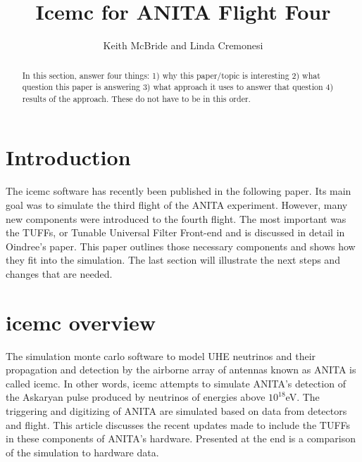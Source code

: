 \documentclass[12pt]{article}
\theoremstyle{plain}
\theoremstyle{definition}
\begin{document}
 

\title{Icemc for ANITA Flight Four}
\author{Keith McBride and Linda Cremonesi}
\maketitle
\begin{abstract}
	In this section, answer four things: 1) why this paper/topic is interesting 2) what question this paper is answering 3) what approach it uses to answer that question 4) results of the approach. These do not have to be in this order.
\end{abstract}
\tableofcontents
\pagebreak
\section{Introduction}
\hspace{0.2in}
  The icemc software has recently been published in the following paper. Its main goal was to simulate the third flight of the ANITA experiment.  However, many new components were introduced to the fourth flight. The most important was the TUFFs, or Tunable Universal Filter Front-end and is discussed in detail in Oindree's paper. This paper outlines those necessary components and shows how they fit into the simulation. The last section will illustrate the next steps and changes that are needed.
\section{icemc overview}
\hspace{0.2in}
The simulation monte carlo software to model UHE neutrinos and their propagation and detection by the airborne array of antennas known as ANITA is called icemc. In other words, icemc attempts to simulate ANITA's detection of the Askaryan pulse produced by neutrinos of energies above $10^{18}$eV. The triggering and digitizing of ANITA are simulated based on data from detectors and flight. This article discusses the recent updates made to include the TUFFs in these components of ANITA's hardware. Presented at the end is a comparison of the simulation to hardware data. 
\end{document}
